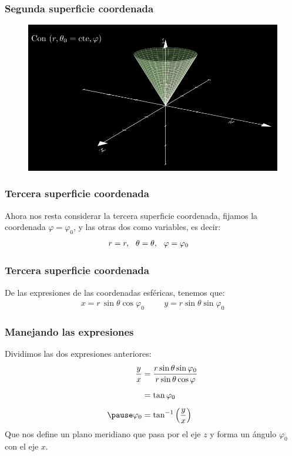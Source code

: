 \documentclass[12pt]{beamer}
\begin{document}
{
\begin{frame}
\frametitle{Segunda superficie coordenada}
\begin{figure}
   \centering
   \includegraphics[width=0.95\linewidth]{Imagenes/superficies_esfericas_02.png}
   \label{fig:superficies_esfericas_02}
\end{figure}
\end{frame}
}
\begin{frame}
\frametitle{Tercera superficie coordenada}
Ahora nos resta considerar la tercera superficie coordenada, fijamos la coordenada $\varphi = \varphi_{0}$, y las otras dos como variables, es decir:
\begin{align*}
r &= r, \hspace{0.25cm} \theta = \theta, \hspace{0.25cm} \varphi = \varphi_{0}
\end{align*}
\end{frame}
\begin{frame}
\frametitle{Tercera superficie coordenada}
De las expresiones de las coordenadas esféricas, tenemos que:
\pause
\begin{align*}
x = r \, \sin \theta \cos \varphi_{0} \hspace{1cm} y = r \sin \theta \sin \varphi_{0}
\end{align*}
\end{frame}
\begin{frame}
\frametitle{Manejando las expresiones}
Dividimos las dos expresiones anteriores:
\pause
\begin{eqnarray*}
\begin{aligned}
\dfrac{y}{x} &= \dfrac{r \sin \theta \sin \varphi_{0}}{r \sin \theta \cos \varphi} \\[0.5em]
&= \tan \varphi_{0} \\[0.5em] \pause
\varphi_{0} &= \tan^{-1} \left( \dfrac{y}{x} \right)
\end{aligned}
\end{eqnarray*}
Que nos define un plano meridiano que pasa por el eje $z$ y forma un ángulo $\varphi_{0}$ con el eje $x$.
\end{frame}
\end{document}

